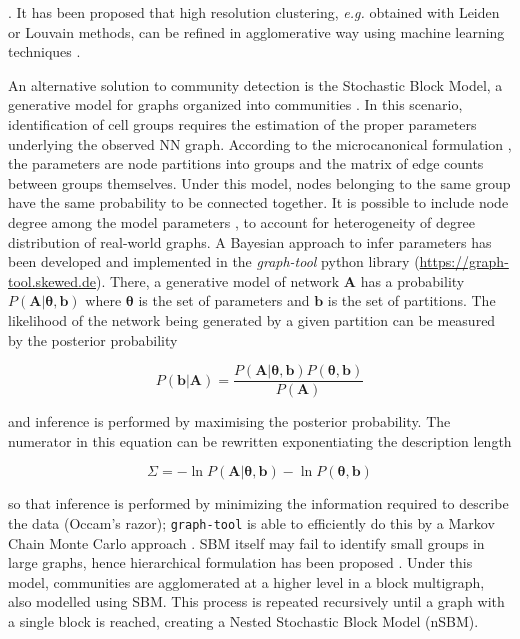\documentclass[10pt]{article}
\begin{document}
\cite{xu_2015}. It has been proposed that high resolution clustering, \emph{e.g.} obtained with Leiden or Louvain methods, can be refined in agglomerative way using machine learning techniques \cite{miao_2020}.

An alternative solution to community detection is the Stochastic Block Model, a generative model for graphs organized into communities \cite{holland_1983}. In this scenario, identification of cell groups requires the estimation of the proper parameters underlying the observed NN graph. According to the microcanonical formulation \cite{peixoto_2017}, the parameters are node partitions into groups and the matrix of edge counts between groups themselves. Under this model, nodes belonging to the same group have the same probability to be connected together. It is possible to include node degree among the model parameters \cite{karrer_2011}, to account for heterogeneity of degree distribution of real-world graphs. A Bayesian approach to infer parameters has been developed \cite{peixoto_2013} and implemented in the \emph{graph-tool} python library (\href{https://graph-tool.skewed.de}{https:/\slash graph-tool.skewed.de}). There, a generative model of network $\boldsymbol A$ has a probability $P(\boldsymbol A|\boldsymbol\theta, \boldsymbol b)$ where \textbf{$\boldsymbol\theta$} is the set of parameters and \textbf{\emph{$\boldsymbol b$}} is the set of partitions. The likelihood of the network being generated by a given partition can be measured by the posterior probability


\begin{MPEquation}[!ht]
\begin{equation}
P(\boldsymbol b | \boldsymbol A) = \frac{P(\boldsymbol A|\boldsymbol\theta, \boldsymbol b)P(\boldsymbol\theta, \boldsymbol b)}{P(\boldsymbol A)}
\end{equation}
\label{Equation_posterior}
\end{MPEquation}
and inference is performed by maximising the posterior probability. The numerator in this equation can be rewritten exponentiating the description length


\begin{MPEquation}[!ht]
\begin{equation}
\Sigma = -\ln P(\boldsymbol A|\boldsymbol\theta, \boldsymbol b) - \ln P(\boldsymbol\theta, \boldsymbol b)
\end{equation}
\label{Equation_entropy}
\end{MPEquation}

so that inference is performed by minimizing the information required to describe the data (Occam's razor); \texttt{graph-tool} is able to efficiently do this by a Markov Chain Monte Carlo approach \cite{peixoto_2014}. SBM itself may fail to identify small groups in large graphs, hence hierarchical formulation has been proposed \cite{peixoto_2014_h}. Under this model, communities are agglomerated at a higher level in a block multigraph, also modelled using SBM. This process is repeated recursively until a graph with a single block is reached, creating a Nested Stochastic Block Model (nSBM).
\end{document}

